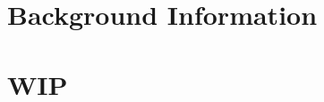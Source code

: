 \documentclass{newrucsthesis}
\begin{document}


\tableofcontents
\printglossaries


%

\chapter{Background Information}






\chapter{WIP}







\end{document}
